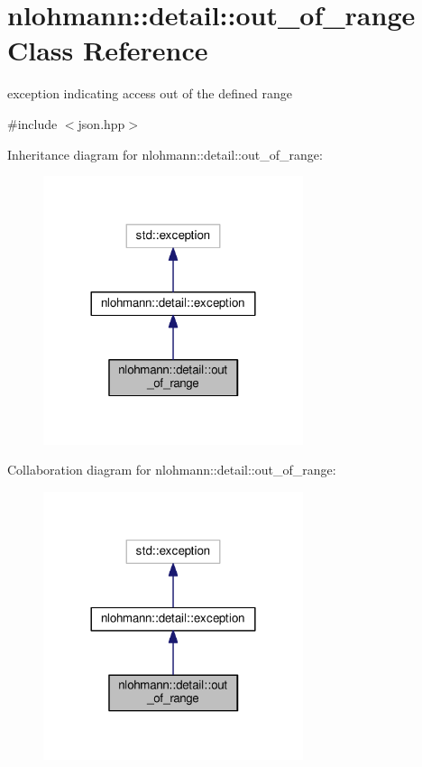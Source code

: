 \hypertarget{classnlohmann_1_1detail_1_1out__of__range}{}\section{nlohmann\+:\+:detail\+:\+:out\+\_\+of\+\_\+range Class Reference}
\label{classnlohmann_1_1detail_1_1out__of__range}


exception indicating access out of the defined range  




{\ttfamily \#include $<$json.\+hpp$>$}



Inheritance diagram for nlohmann\+:\+:detail\+:\+:out\+\_\+of\+\_\+range\+:\nopagebreak
\begin{figure}[H]
\begin{center}
\leavevmode
\includegraphics[width=216pt]{classnlohmann_1_1detail_1_1out__of__range__inherit__graph}
\end{center}
\end{figure}


Collaboration diagram for nlohmann\+:\+:detail\+:\+:out\+\_\+of\+\_\+range\+:\nopagebreak
\begin{figure}[H]
\begin{center}
\leavevmode
\includegraphics[width=216pt]{classnlohmann_1_1detail_1_1out__of__range__coll__graph}
\end{center}
\end{figure}
